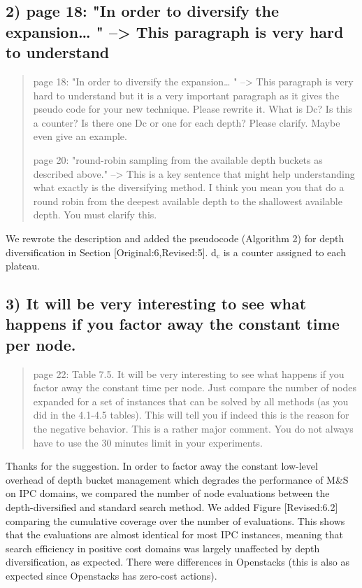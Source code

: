\documentclass{article}
\begin{document}
\subsection{2) page 18: "In order to diversify the expansion\ldots{} " --> This paragraph is very hard to understand}
\label{sec:orgheadline2}

\begin{quote}
page 18: "In order to diversify the expansion\ldots{} " --> This
paragraph is very hard to understand but it is a very important
paragraph as it gives the pseudo code for your new technique. Please
rewrite it. What is Dc? Is this a counter? Is there one Dc or one for
each depth? Please clarify. Maybe even give an example.

page 20: "round-robin sampling from the available depth buckets as
described above." --> This is a key sentence that might help
understanding what exactly is the diversifying method. I think you
mean you that do a round robin from the deepest available depth to the
shallowest available depth. You must clarify this.
\end{quote}

We rewrote the description and added the pseudocode (Algorithm 2) for depth diversification
in Section [Original:6,Revised:5].
d\(_{\text{c}}\) is a counter assigned to each plateau.

\subsection{3) It will be very interesting to see what happens if you factor away the constant time per node.}
\label{sec:orgheadline3}

\begin{quote}
page 22: Table 7.5. It will be very interesting to see what
happens if you factor away the constant time per node. Just compare
the number of nodes expanded for a set of instances that can be solved
by all methods (as you did in the 4.1-4.5 tables). This will tell you
if indeed this is the reason for the negative behavior. This is a
rather major comment. You do not always have to use the 30 minutes
limit in your experiments.
\end{quote}

Thanks for the suggestion. In order to factor away the constant low-level overhead of depth bucket management
which degrades the performance of M\&S on IPC domains,
we compared the number of node evaluations between the depth-diversified and standard search method.
We added Figure [Revised:6.2] comparing the cumulative coverage over the number of evaluations.
This shows that the evaluations are almost identical for most IPC instances, meaning that search efficiency in positive cost domains was largely unaffected by depth diversification, as expected.
There were differences in Openstacks (this is also as expected since Openstacks has zero-cost actions).
\end{document}
